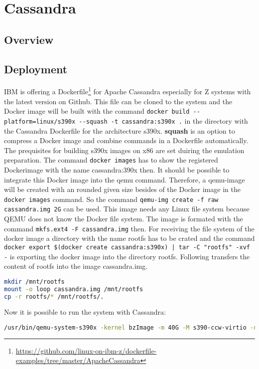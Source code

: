 \chapter{Cassandra}\label{ch:cassandra}

\section{Overview}

\section{Deployment}

IBM is offering a Dockerfile\footnote{\url{https://github.com/linux-on-ibm-z/dockerfile-examples/tree/master/ApacheCassandra}} for Apache Cassandra especially for Z systems with the latest version on Github. This file can be cloned to the system and the Docker image will be built with the command  \lstinline!docker build --platform=linux/s390x --squash -t cassandra:s390x .! in the directory with the Cassandra Dockerfile  for the architecture s390x. \textbf{squash} is an option to compress a Docker image and combine commands in a Dockerfile automatically. The prequisites for building s390x images on x86 are set duiring the emulation preparation. The command \lstinline!docker images! has to show the registered Dockerimage with the name cassandra:390x then. It should be possible to integrate this Docker image into the qemu command. Therefore, a qemu-image will be created with an rounded given size besides of the Docker image in the  \lstinline!docker images! command. So the command  \lstinline!qemu-img create -f raw cassandra.img 2G! can be used. This image needs any Linux file system because QEMU does not know the Docker file system. The image is formated with the command  \lstinline!mkfs.ext4 -F cassandra.img! then. For receiving the file system of the docker image a directory with the name rootfs has to be crated and the command
\lstinline!docker export $(docker create cassandra:s390x) | tar -C "rootfs" -xvf -! is exporting the docker image into the directory rootfs. Following transfers the content of rootfs into the image cassandra.img.

\begin{lstlisting}[language=bash,caption={Mount rootfs},captionpos=b]
mkdir /mnt/rootfs
mount -o loop cassandra.img /mnt/rootfs
cp -r rootfs/* /mnt/rootfs/.
 \end{lstlisting}

Now it is possible to run the system with Cassandra: \\
\begin{lstlisting}[language=bash,caption={Run Cassandra},captionpos=b]
 /usr/bin/qemu-system-s390x -kernel bzImage -m 40G -M s390-ccw-virtio -nodefaults -device sclpconsole,chardev=console -parallel none -net none -chardev stdio,id=console,signal=off,mux=on -mon chardev=console -nographic -smp 3 -hda /data/dockerfile-examples/ApacheCassandra/cassandra.img --append 'root=/dev/vda rw console=ttyS0 rdinit=/bin/bash' 
 \end{lstlisting}
 
